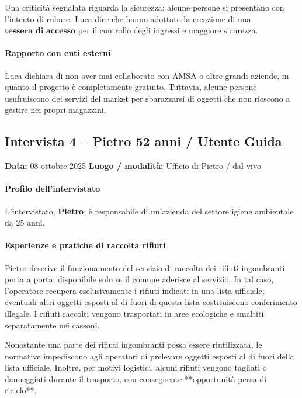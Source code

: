 \documentclass[12pt,a4paper]{article}
\begin{document}
Una criticità segnalata riguarda la sicurezza: alcune persone si presentano con l’intento di rubare. Luca dice che hanno adottato la creazione di una $\textbf{tessera di accesso}$ per il controllo degli ingressi e maggiore sicurezza.  

\paragraph{Rapporto con enti esterni}

Luca dichiara di non aver mai collaborato con AMSA o altre grandi aziende, in quanto il progetto è completamente gratuito. Tuttavia, alcune persone usufruiscono dei servizi del market per sbarazzarsi di oggetti che non riescono a gestire nei propri magazzini.  

\newpage

\subsection{Intervista 4 – Pietro 52 anni / Utente Guida}
\textbf{Data:} 08 ottobre 2025  
\textbf{Luogo / modalità:} Ufficio di Pietro / dal vivo 

\paragraph{Profilo dell’intervistato}

L’intervistato, \textbf{Pietro}, è responsabile di un’azienda del settore igiene ambientale da 25 anni.  

\paragraph{Esperienze e pratiche di raccolta rifiuti}

Pietro descrive il funzionamento del servizio di raccolta dei rifiuti ingombranti porta a porta, disponibile solo se il comune aderisce al servizio. In tal caso, l’operatore recupera esclusivamente i rifiuti indicati in una lista ufficiale; eventuali altri oggetti esposti al di fuori di questa lista costituiscono conferimento illegale. I rifiuti raccolti vengono trasportati in aree ecologiche e smaltiti separatamente nei cassoni.  

Nonostante una parte dei rifiuti ingombranti possa essere riutilizzata, le normative impediscono agli operatori di prelevare oggetti esposti al di fuori della lista ufficiale. Inoltre, per motivi logistici, alcuni rifiuti vengono tagliati o danneggiati durante il trasporto, con conseguente **opportunità persa di riciclo**.  
\end{document}
